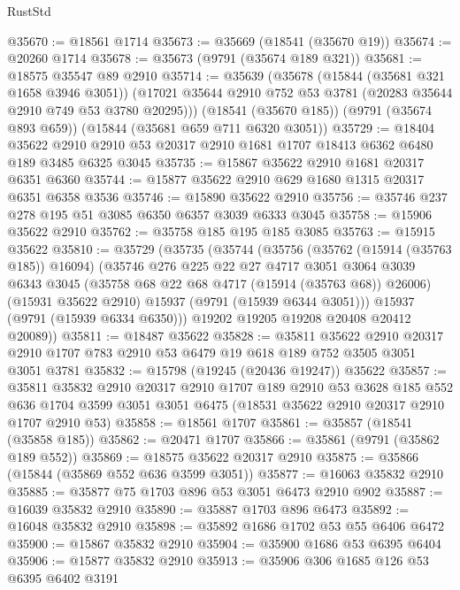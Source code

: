 \begin{lexlean}{RustStd}
\begin{coremodule}
@35670 := @18561 @1714
@35673 := @35669 (@18541 (@35670 @19))
@35674 := @20260 @1714
@35678 := @35673 (@9791 (@35674 @189 @321))
@35681 := @18575 @35547 @89 @2910
@35714 := @35639
    (@35678
      (@15844 (@35681 @321 @1658 @3946 @3051))
      (@17021 @35644 @2910 @752 @53 @3781 (@20283 @35644 @2910 @749 @53 @3780 @20295)))
    (@18541 (@35670 @185))
    (@9791 (@35674 @893 @659))
    (@15844 (@35681 @659 @711 @6320 @3051))
@35729 := @18404
    @35622
    @2910
    @2910
    @53
    @20317
    @2910
    @1681
    @1707
    @18413
    @6362
    @6480
    @189
    @3485
    @6325
    @3045
@35735 := @15867 @35622 @2910 @1681 @20317 @6351 @6360
@35744 := @15877 @35622 @2910 @629 @1680 @1315 @20317 @6351 @6358 @3536
@35746 := @15890 @35622 @2910
@35756 := @35746 @237 @278 @195 @51 @3085 @6350 @6357 @3039 @6333 @3045
@35758 := @15906 @35622 @2910
@35762 := @35758 @185 @195 @185 @3085
@35763 := @15915 @35622
@35810 := @35729
    (@35735
      (@35744
        (@35756
          (@35762 (@15914 (@35763 @185)) @16094)
          (@35746
            @276
            @225
            @22
            @27
            @4717
            @3051
            @3064
            @3039
            @6343
            @3045
            (@35758 @68 @22 @68 @4717 (@15914 (@35763 @68)) @26006)
            (@15931 @35622 @2910)
            @15937
            (@9791 (@15939 @6344 @3051)))
          @15937
          (@9791 (@15939 @6334 @6350)))
        @19202
        @19205
        @19208
        @20408
        @20412
        @20089))
@35811 := @18487 @35622
@35828 := @35811
    @35622
    @2910
    @20317
    @2910
    @1707
    @783
    @2910
    @53
    @6479
    @19
    @618
    @189
    @752
    @3505
    @3051
    @3051
    @3781
@35832 := @15798 (@19245 (@20436 @19247)) @35622
@35857 := @35811
    @35832
    @2910
    @20317
    @2910
    @1707
    @189
    @2910
    @53
    @3628
    @185
    @552
    @636
    @1704
    @3599
    @3051
    @3051
    @6475
    (@18531 @35622 @2910 @20317 @2910 @1707 @2910 @53)
@35858 := @18561 @1707
@35861 := @35857 (@18541 (@35858 @185))
@35862 := @20471 @1707
@35866 := @35861 (@9791 (@35862 @189 @552))
@35869 := @18575 @35622 @20317 @2910
@35875 := @35866 (@15844 (@35869 @552 @636 @3599 @3051))
@35877 := @16063 @35832 @2910
@35885 := @35877 @75 @1703 @896 @53 @3051 @6473 @2910 @902
@35887 := @16039 @35832 @2910
@35890 := @35887 @1703 @896 @6473
@35892 := @16048 @35832 @2910
@35898 := @35892 @1686 @1702 @53 @55 @6406 @6472
@35900 := @15867 @35832 @2910
@35904 := @35900 @1686 @53 @6395 @6404
@35906 := @15877 @35832 @2910
@35913 := @35906 @306 @1685 @126 @53 @6395 @6402 @3191

\end{coremodule}
\end{lexlean}
